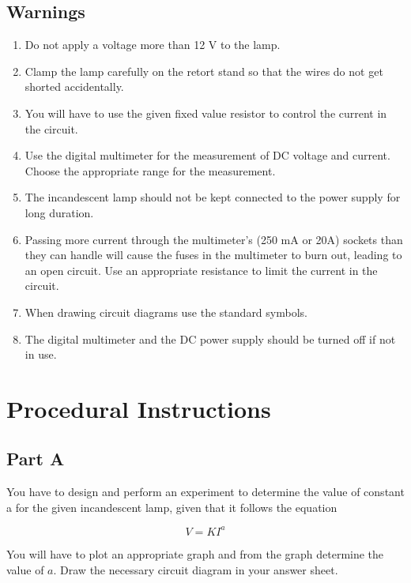 \subsection*{Warnings}

\begin{enumerate}
\item Do not apply a voltage more than 12 V to the lamp.
\item Clamp the lamp carefully on the retort stand so that the wires do not get shorted accidentally.
\item You will have to use the given fixed value resistor to control the current in the circuit.
\item Use the digital multimeter for the measurement of DC voltage and current.  Choose the appropriate range for the measurement.
\item The incandescent lamp should not be kept connected to the power supply for long duration. 

\item Passing more current through the multimeter's (250 mA or 20A) sockets than they can handle will cause the fuses in the multimeter to burn out, leading to an open circuit. Use an appropriate resistance to limit the current in the circuit.

\item When drawing circuit diagrams use the standard symbols.

\item The digital multimeter and the DC power supply should be turned off if not in use.

\end{enumerate}


\section*{Procedural Instructions}

\subsection*{Part A}

You have to design and perform an experiment to determine the value of constant a for the given incandescent lamp, given that it follows the equation 

\begin{equation*}
V = K I^a
\end{equation*}

You will have to plot an appropriate graph and from the graph determine the value of $a$. Draw the necessary circuit diagram in your answer sheet.

